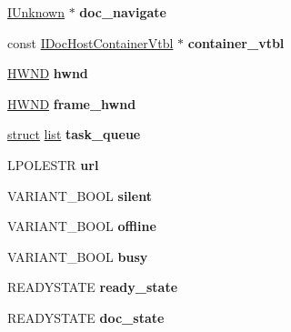 \begin{DoxyCompactItemize}
\hyperlink{interface_i_unknown}{I\+Unknown} $\ast$ {\bfseries doc\+\_\+navigate}
\item 
\mbox{\label{struct_doc_host_a30873f4c74b529c49a1bb954cf4c94c5}} 
const \hyperlink{struct___i_doc_host_container_vtbl}{I\+Doc\+Host\+Container\+Vtbl} $\ast$ {\bfseries container\+\_\+vtbl}
\item 
\mbox{\label{struct_doc_host_ae811ddf196dd3d191f2df968ba555a01}} 
\hyperlink{interfacevoid}{H\+W\+ND} {\bfseries hwnd}
\item 
\mbox{\label{struct_doc_host_ae8804947d14bdfeeb28366a115bae6c8}} 
\hyperlink{interfacevoid}{H\+W\+ND} {\bfseries frame\+\_\+hwnd}
\item 
\mbox{\label{struct_doc_host_afcf4f3314c9a20dbd273a445907f2c4e}} 
\hyperlink{interfacestruct}{struct} \hyperlink{classlist}{list} {\bfseries task\+\_\+queue}
\item 
\mbox{\label{struct_doc_host_ae52daaffcb8a60f0101624499d4b244b}} 
L\+P\+O\+L\+E\+S\+TR {\bfseries url}
\item 
\mbox{\label{struct_doc_host_a496d74b7a60e20b38aa55177e2d86f65}} 
V\+A\+R\+I\+A\+N\+T\+\_\+\+B\+O\+OL {\bfseries silent}
\item 
\mbox{\label{struct_doc_host_a45ebbf36dccf46362bb9009b8ec591d6}} 
V\+A\+R\+I\+A\+N\+T\+\_\+\+B\+O\+OL {\bfseries offline}
\item 
\mbox{\label{struct_doc_host_a1b31bcffe69430974cd043da91a91583}} 
V\+A\+R\+I\+A\+N\+T\+\_\+\+B\+O\+OL {\bfseries busy}
\item 
\mbox{\label{struct_doc_host_a3a5a3ea8cd099dbcbbd5e9c9243be38f}} 
R\+E\+A\+D\+Y\+S\+T\+A\+TE {\bfseries ready\+\_\+state}
\item 
\mbox{\label{struct_doc_host_a770e9b7a4a7b8e2c0996d43b439e3dbe}} 
R\+E\+A\+D\+Y\+S\+T\+A\+TE {\bfseries doc\+\_\+state}
\item 
\mbox{\label{struct_doc_host_afd7a0d376b5b05f942b82c25b77e70f3}} 

\end{DoxyCompactItemize}

